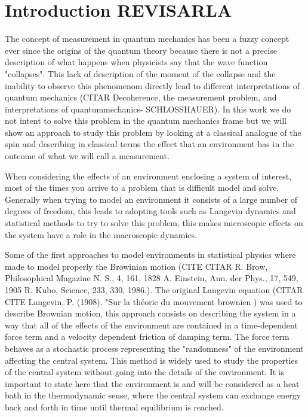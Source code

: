 \chapter{Introduction REVISARLA}

The concept of measurement in quantum mechanics has been a fuzzy concept ever since the origins of the quantum theory because there is not a precise description of what happens when physicists say that the wave function "collapses". This lack of description of the moment of the collapse and the inability to observe this phenomenom directly lead to different interpretations of quantum mechanics (CITAR Decoherence, the measurement problem, and interpretations of quantummechanics- SCHLOSSHAUER). In this work we do not intent to solve this problem in the quantum mechanics frame but we will show an approach to study this problem by looking at a classical analogue of the spin and describing in classical terms the effect that an environment has in the outcome of what we will call a measurement. \par

When considering the effects of an environment enclosing a system of interest, most of the times you arrive to a problem that is difficult model and solve. Generally when trying to model an environment it consists of a large number of degrees of freedom, this leads to adopting tools such as Langevin dynamics and statistical methods to try to solve this problem, this makes microscopic effects on the system have a role in the macroscopic dynamics.\par 

Some of the first approaches to model environments in statistical physics where made to model properly the Browinian motion (CITE CITAR R. Brow, Philosophical Magazine N. S., 4, 161, 1828 A. Einstein, Ann. der Phys., 17, 549, 1905 R. Kubo, Science, 233, 330, 1986.). The original Langevin equation (CITAR CITE Langevin, P. (1908). "Sur la théorie du mouvement brownien ) was used to describe Brownian motion, this approach consists on describing the system in a way that all of the effects of the environment are contained in a time-dependent force term and a velocity dependent friction of damping term. The force term behaves as a stochastic process representing the "randomness" of the environment affecting the central system. This method is widely used to study the properties of the central system without going into the details of the environment. It is important to state here that the environment is and will be  considered as a heat bath in the thermodynamic sense, where the central system can exchange energy back and forth in time until thermal equilibrium is reached.\par 

